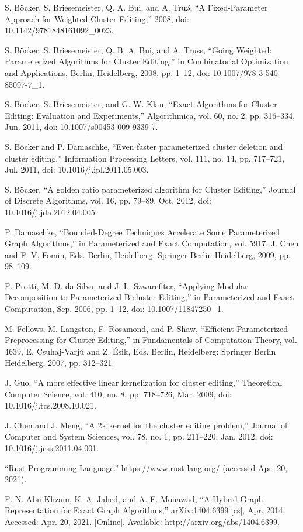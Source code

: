 \documentclass{article}
\theoremstyle{definition}
\begin{document}
\begin{thebibliography}{99}
S. Böcker, S. Briesemeister, Q. A. Bui, and A. Truß, “A Fixed-Parameter Approach for Weighted
Cluster Editing,” 2008, doi: 10.1142/9781848161092\_0023.

S. Böcker, S. Briesemeister, Q. B. A. Bui, and A. Truss, “Going Weighted: Parameterized
Algorithms for Cluster Editing,” in Combinatorial Optimization and Applications, Berlin, Heidelberg,
2008, pp. 1–12, doi: 10.1007/978-3-540-85097-7\_1.

S. Böcker, S. Briesemeister, and G. W. Klau, “Exact Algorithms for Cluster Editing: Evaluation
and Experiments,” Algorithmica, vol. 60, no. 2, pp. 316–334, Jun. 2011, doi:
10.1007/s00453-009-9339-7.

S. Böcker and P. Damaschke, “Even faster parameterized cluster deletion and cluster editing,”
Information Processing Letters, vol. 111, no. 14, pp. 717–721, Jul. 2011, doi:
10.1016/j.ipl.2011.05.003.

S. Böcker, “A golden ratio parameterized algorithm for Cluster Editing,” Journal of Discrete
Algorithms, vol. 16, pp. 79–89, Oct. 2012, doi: 10.1016/j.jda.2012.04.005.

P. Damaschke, “Bounded-Degree Techniques Accelerate Some Parameterized Graph Algorithms,” in
Parameterized and Exact Computation, vol. 5917, J. Chen and F. V. Fomin, Eds. Berlin, Heidelberg:
Springer Berlin Heidelberg, 2009, pp. 98–109.

F. Protti, M. D. da Silva, and J. L. Szwarcfiter, “Applying Modular Decomposition to
Parameterized Bicluster Editing,” in Parameterized and Exact Computation, Sep. 2006, pp. 1–12, doi:
10.1007/11847250\_1.

M. Fellows, M. Langston, F. Rosamond, and P. Shaw, “Efficient Parameterized Preprocessing for
Cluster Editing,” in Fundamentals of Computation Theory, vol. 4639, E. Csuhaj-Varjú and Z. Ésik,
Eds. Berlin, Heidelberg: Springer Berlin Heidelberg, 2007, pp. 312–321.

J. Guo, “A more effective linear kernelization for cluster editing,” Theoretical
Computer Science, vol. 410, no. 8, pp. 718–726, Mar. 2009, doi: 10.1016/j.tcs.2008.10.021.

J. Chen and J. Meng, “A 2k kernel for the cluster editing problem,” Journal of Computer and
System Sciences, vol. 78, no. 1, pp. 211–220, Jan. 2012, doi: 10.1016/j.jcss.2011.04.001.

“Rust Programming Language.” https://www.rust-lang.org/ (accessed Apr. 20, 2021).

F. N. Abu-Khzam, K. A. Jahed, and A. E. Mouawad, “A Hybrid Graph Representation for Exact Graph
Algorithms,” arXiv:1404.6399 [cs], Apr. 2014, Accessed: Apr. 20, 2021. [Online]. Available:
http://arxiv.org/abs/1404.6399.

\end{thebibliography}
\end{document}
